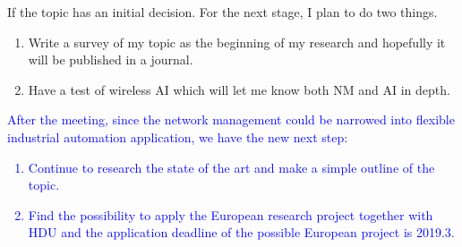 \documentclass[journal,UTF8]{IEEEtran}
\begin{document}
If the topic has an initial decision. For the next stage, I plan to do two things.
\begin{enumerate}
	\item Write a survey of my topic as the beginning of my research and hopefully it will be published in a journal.
	\item Have a test of wireless AI which will let me know both NM and AI in depth.
\end{enumerate}

\textcolor{blue}{After the meeting, since the network management could be narrowed into flexible industrial automation application, we have the new next step:
\begin{enumerate}
	\item Continue to research the state of the art and make a simple outline of the topic.
	\item Find the possibility to apply the European research project together with HDU and the application deadline of the possible European project is 2019.3.  
\end{enumerate}}


\ifCLASSOPTIONcaptionsoff
  \newpage
\fi





%
%
%




%
\end{document}
